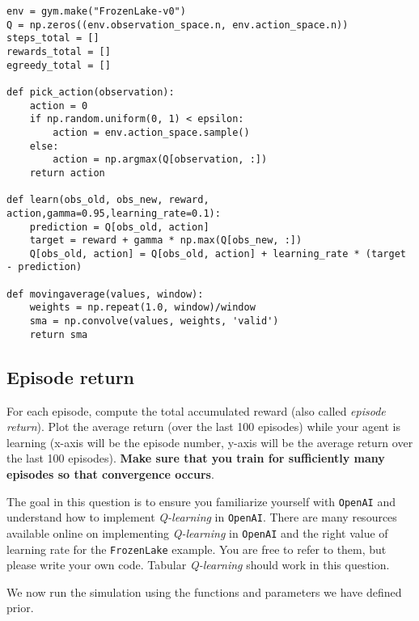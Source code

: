 \documentclass[12pt, letterpaper]{article}
\newcommand{\mybox}[1]{\par\noindent\colorbox{shadecolor}
{\parbox{\dimexpr\textwidth-2\fboxsep\relax}{#1}}}
\begin{document}
\begin{mdframed}[backgroundcolor=shadecolor]
\begin{verbatim}
env = gym.make("FrozenLake-v0")
Q = np.zeros((env.observation_space.n, env.action_space.n))
steps_total = []
rewards_total = []
egreedy_total = []

def pick_action(observation):
    action = 0
    if np.random.uniform(0, 1) < epsilon:
        action = env.action_space.sample()
    else:
        action = np.argmax(Q[observation, :])
    return action

def learn(obs_old, obs_new, reward, action,gamma=0.95,learning_rate=0.1):
    prediction = Q[obs_old, action]
    target = reward + gamma * np.max(Q[obs_new, :])
    Q[obs_old, action] = Q[obs_old, action] + learning_rate * (target - prediction)

def movingaverage(values, window):    
    weights = np.repeat(1.0, window)/window
    sma = np.convolve(values, weights, 'valid')
    return sma
\end{verbatim}
\end{mdframed}

\subsection{Episode return}
\mybox{For each episode, compute the total accumulated reward (also called \textit{episode return}). Plot the average return (over the last 100 episodes) while your agent is learning (x-axis will be the episode number, y-axis will be the average return over the last 100 episodes). \textbf{Make sure that you train for sufficiently many episodes so that convergence occurs}.

The goal in this question is to ensure you familiarize yourself with \texttt{OpenAI} and understand how to implement \textit{Q-learning} in \texttt{OpenAI}. 
There are many resources available online on implementing \textit{Q-learning} in \texttt{OpenAI} and the right value of learning rate for the \texttt{FrozenLake} example.
You are free to refer to them, but please write your own code. 
Tabular \textit{Q-learning} should work in this question.}

We now run the simulation using the functions and parameters we have defined prior.
\end{document}
